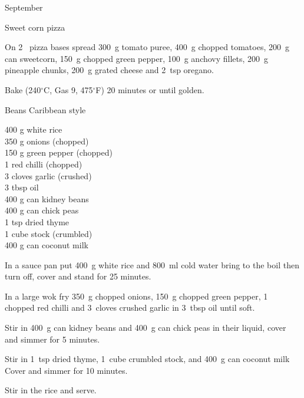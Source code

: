 \begin{menu}{September}
\begin{recipe}{2}{Sweet corn pizza}
\begin{ingredients}
		\end{ingredients}
	
	
    \begin{instructions}
    \item 
        On
        2~  pizza bases
        spread
        300~g  tomato puree,
        400~g chopped tomatoes,
        200~g  can sweetcorn,
        150~g chopped green pepper,
        100~g  anchovy fillets,
        200~g  pineapple chunks,
        200~g grated cheese
        and
        2~tsp  oregano.
      \item 
        Bake 
      (240$^{\circ}$C, Gas 9, 475$^{\circ}$F)
     20 minutes or until golden.
      
    \end{instructions}
    \end{recipe}%
  
    \begin{recipe}{2}{Beans Caribbean style}%
    
		\begin{ingredients}
		400 g white rice  \\
	350 g onions (chopped) \\
	150 g green pepper (chopped) \\
	1  red chilli (chopped) \\
	3 cloves garlic (crushed) \\
	3 tbsp oil  \\
	400 g can kidney beans  \\
	400 g can chick peas  \\
	1 tsp dried thyme  \\
	1 cube stock (crumbled) \\
	400 g can coconut milk  \\
	
		\end{ingredients}
	
	
    \begin{instructions}
    \item 
      In a
      sauce pan
      put
      400~g  white rice
      and
      800~ml  cold water
      bring to the boil then turn off, cover and stand for 25 minutes.
    \item 
        In a large wok fry
        350~g chopped onions,
        150~g chopped green pepper,
        1~ chopped red chilli
        and
        3~cloves crushed garlic
        in
        3~tbsp  oil
        until soft.
      \item 
        Stir in
        400~g  can kidney beans
        and
        400~g  can chick peas
        in their liquid,
        cover and simmer for 5 minutes.
      \item 
        Stir in
        1~tsp  dried thyme,
        1~cube crumbled stock,
        and
        400~g  can coconut milk
        Cover and simmer for 10 minutes.
      \item 
        Stir in the rice and serve.
      

\end{instructions}
\end{recipe}
\end{menu}
